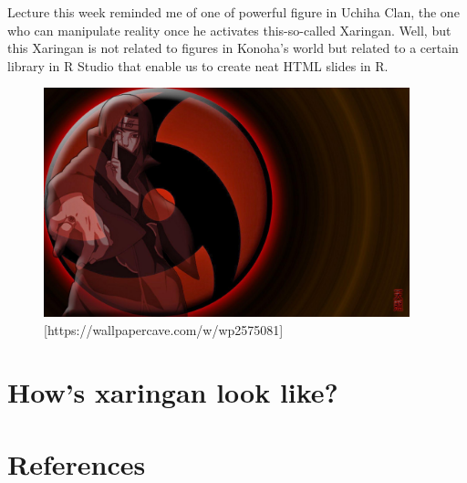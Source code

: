 \documentclass[
  letterpaper,
  DIV=11,
  numbers=noendperiod]{scrreprt}
\newlength{\cslhangindent}
\newlength{\cslentryspacingunit} %
\newenvironment{CSLReferences}[2] %
 {%
  \setlength{\parindent}{0pt}
  \ifodd #1
  \let\oldpar\par
  \def\par{\hangindent=\cslhangindent\oldpar}
  \fi
  \setlength{\parskip}{#2\cslentryspacingunit}
 }%
 {}
\begin{document}
Lecture this week reminded me of one of powerful figure in Uchiha Clan,
the one who can manipulate reality once he activates this-so-called
Xaringan. Well, but this Xaringan is not related to figures in Konoha's
world but related to a certain library in R Studio that enable us to
create neat HTML slides in R.

\begin{figure}

{\centering \includegraphics[width=4.17708in,height=\textheight]{images/wp2575081-itachi-sharingan-wallpaper.jpg}

}

\caption{{[}https://wallpapercave.com/w/wp2575081{]}}

\end{figure}


\hypertarget{hows-xaringan-look-like}{%
\chapter{How's xaringan look like?}\label{hows-xaringan-look-like}}


\hypertarget{references}{%
\chapter*{References}\label{references}}


\hypertarget{refs}{}
\begin{CSLReferences}{0}{0}
\end{CSLReferences}
\end{document}
